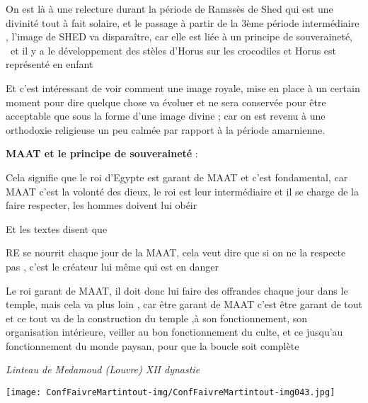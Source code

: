 \documentclass[a4paper]{article}
\begin{document}
{
On est là à une relecture durant la période de Ramssès de Shed qui est
une divinité tout à fait solaire, et le passage à partir de la 3ème
période intermédiaire , l'image de SHED va disparaître, car elle est
liée à un principe de souveraineté, \ et il y a le développement des
stèles d'Horus sur les crocodiles et Horus est représenté en enfant}

{
Et c'est intéressant de voir comment une image royale, mise en place à
un certain moment pour dire quelque chose va évoluer et ne sera
conservée pour être acceptable que sous la forme d'une image divine ;
car on est revenu à une orthodoxie religieuse un peu calmée par rapport
à la période amarnienne.}


\bigskip


\bigskip


\bigskip


\bigskip

{
\textbf{MAAT et le principe de souveraineté} :}


\bigskip

{
Cela signifie que le roi d'Egypte est garant de MAAT et c'est
fondamental, car MAAT c'est la volonté des dieux, le roi est leur
intermédiaire et il se charge de la faire respecter, les hommes doivent
lui obéir}

{
Et les textes disent que }


\bigskip

{
RE se nourrit chaque jour de la MAAT, cela veut dire que si on ne la
respecte pas , c'est le créateur lui même qui est en danger}


\bigskip

{
Le roi garant de MAAT, il doit donc lui faire des offrandes chaque jour
dans le temple, mais cela va plus loin , car être garant de MAAT c'est
être garant de tout et ce tout va de la construction du temple ,à son
fonctionnement, son organisation intérieure, veiller au bon
fonctionnement du culte, et ce jusqu'au fonctionnement du monde paysan,
pour que la boucle soit complète}


\bigskip


\bigskip

{
\textit{Linteau de Medamoud (Louvre) XII dynastie}}


\bigskip


\texttt{[image: ConfFaivreMartintout-img/ConfFaivreMartintout-img043.jpg]}
\end{document}
